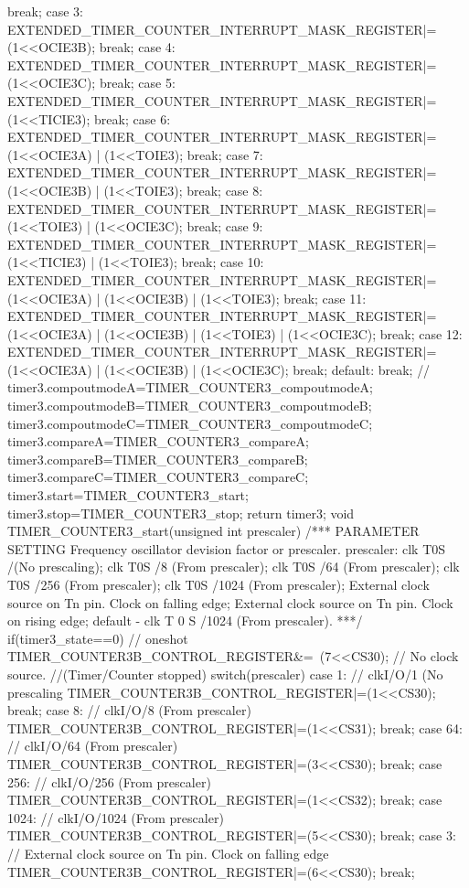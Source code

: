 \begin{verbatimtab}
{{		break;
		case 3:
		EXTENDED_TIMER_COUNTER_INTERRUPT_MASK_REGISTER|=(1<<OCIE3B);
		break;
		case 4:
		EXTENDED_TIMER_COUNTER_INTERRUPT_MASK_REGISTER|=(1<<OCIE3C);
		break;
		case 5:
		EXTENDED_TIMER_COUNTER_INTERRUPT_MASK_REGISTER|=(1<<TICIE3);
		break;
		case 6:
		EXTENDED_TIMER_COUNTER_INTERRUPT_MASK_REGISTER|=(1<<OCIE3A) |
		(1<<TOIE3);
		break;
		case 7:
		EXTENDED_TIMER_COUNTER_INTERRUPT_MASK_REGISTER|=(1<<OCIE3B) |
		(1<<TOIE3);
		break;
		case 8:
		EXTENDED_TIMER_COUNTER_INTERRUPT_MASK_REGISTER|=(1<<TOIE3) |
		(1<<OCIE3C);
		break;
		case 9:
		EXTENDED_TIMER_COUNTER_INTERRUPT_MASK_REGISTER|=(1<<TICIE3) |
		(1<<TOIE3);
		break;
		case 10:
		EXTENDED_TIMER_COUNTER_INTERRUPT_MASK_REGISTER|=(1<<OCIE3A) |
		(1<<OCIE3B) | (1<<TOIE3);
		break;
		case 11:
		EXTENDED_TIMER_COUNTER_INTERRUPT_MASK_REGISTER|=(1<<OCIE3A) |
		(1<<OCIE3B) | (1<<TOIE3) | (1<<OCIE3C);
		break;
		case 12:
		EXTENDED_TIMER_COUNTER_INTERRUPT_MASK_REGISTER|=(1<<OCIE3A) |
		(1<<OCIE3B) | (1<<OCIE3C);
		break;
		default:
		break;
	}
	//
	timer3.compoutmodeA=TIMER_COUNTER3_compoutmodeA;
	timer3.compoutmodeB=TIMER_COUNTER3_compoutmodeB;
	timer3.compoutmodeC=TIMER_COUNTER3_compoutmodeC;
	timer3.compareA=TIMER_COUNTER3_compareA;
	timer3.compareB=TIMER_COUNTER3_compareB;
	timer3.compareC=TIMER_COUNTER3_compareC;
	timer3.start=TIMER_COUNTER3_start;
	timer3.stop=TIMER_COUNTER3_stop;
	return timer3;
}
void TIMER_COUNTER3_start(unsigned int prescaler)
/***
PARAMETER SETTING
Frequency oscillator devision factor or prescaler.
prescaler: clk T0S /(No prescaling); clk T0S /8 (From prescaler);
clk T0S /64 (From prescaler);
clk T0S /256 (From prescaler); clk T0S /1024 (From prescaler);
External clock source on Tn pin. Clock on falling edge;
External clock source on Tn pin. Clock on rising edge;
default - clk T 0 S /1024 (From prescaler).
***/
{
	if(timer3_state==0){ // oneshot
		TIMER_COUNTER3B_CONTROL_REGISTER&=~(7<<CS30); // No clock source.
		//(Timer/Counter stopped)
		switch(prescaler){
			case 1: // clkI/O/1 (No prescaling
			TIMER_COUNTER3B_CONTROL_REGISTER|=(1<<CS30);
			break;
			case 8: // clkI/O/8 (From prescaler)
			TIMER_COUNTER3B_CONTROL_REGISTER|=(1<<CS31);
			break;
			case 64: // clkI/O/64 (From prescaler)
			TIMER_COUNTER3B_CONTROL_REGISTER|=(3<<CS30);
			break;
			case 256: // clkI/O/256 (From prescaler)
			TIMER_COUNTER3B_CONTROL_REGISTER|=(1<<CS32);
			break;
			case 1024: // clkI/O/1024 (From prescaler)
			TIMER_COUNTER3B_CONTROL_REGISTER|=(5<<CS30);
			break;
			case 3: // External clock source on Tn pin. Clock on falling edge
			TIMER_COUNTER3B_CONTROL_REGISTER|=(6<<CS30);
			break;
}}}
\end{verbatimtab}
